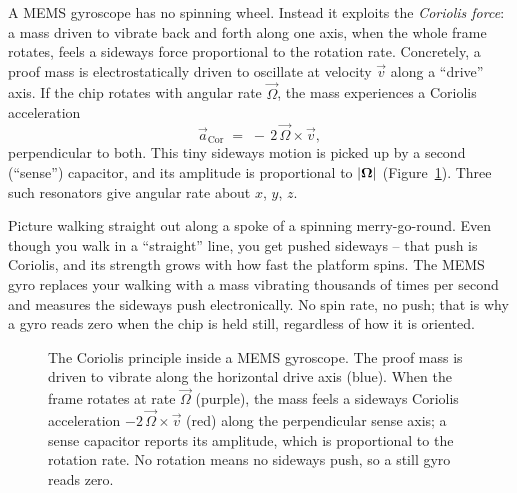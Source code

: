 A MEMS gyroscope has no spinning wheel. Instead it exploits the \emph{Coriolis force}:
a mass driven to vibrate back and forth along one axis, when the whole frame rotates,
feels a sideways force proportional to the rotation rate. Concretely, a proof mass is
electrostatically driven to oscillate at velocity $\vec v$ along a ``drive'' axis. If
the chip rotates with angular rate $\vec\Omega$, the mass experiences a Coriolis
acceleration
\[
  \vec a_{\text{Cor}} \;=\; -\,2\,\vec\Omega \times \vec v,
\]
perpendicular to both. This tiny sideways motion is picked up by a second
(``sense'') capacitor, and its amplitude is proportional to $\lvert\mathbf{\Omega}\rvert$
(Figure~\ref{ch34:fig-coriolis}). Three such resonators give angular rate about
$x$, $y$, $z$.

\begin{intuitionbox}
Picture walking straight out along a spoke of a spinning merry-go-round. Even though
you walk in a ``straight'' line, you get pushed sideways -- that push is Coriolis, and
its strength grows with how fast the platform spins. The MEMS gyro replaces your
walking with a mass vibrating thousands of times per second and measures the sideways
push electronically. No spin rate, no push; that is why a gyro reads zero when the chip
is held still, regardless of how it is oriented.
\end{intuitionbox}

\begin{figure}[H]
\centering
{}
\caption{The Coriolis principle inside a MEMS gyroscope. The proof mass is driven to
vibrate along the horizontal drive axis (blue). When the frame rotates at rate
$\vec\Omega$ (purple), the mass feels a sideways Coriolis acceleration
$-2\,\vec\Omega\times\vec v$ (red) along the perpendicular sense axis; a sense capacitor
reports its amplitude, which is proportional to the rotation rate. No rotation means no
sideways push, so a still gyro reads zero.}
\label{ch34:fig-coriolis}
\end{figure}

